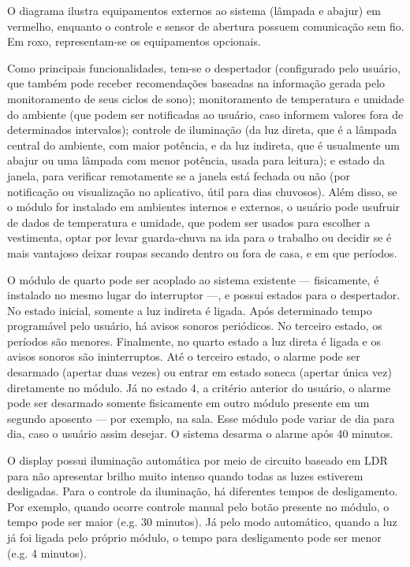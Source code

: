 O diagrama ilustra equipamentos externos ao sistema (lâmpada e abajur) em vermelho, enquanto o controle e sensor de abertura possuem comunicação sem fio. Em roxo, representam-se os equipamentos opcionais.

Como principais funcionalidades, tem-se o despertador (configurado pelo usuário, que também pode receber recomendações baseadas na informação gerada pelo monitoramento de seus ciclos de sono); monitoramento de temperatura e umidade do ambiente (que podem ser notificadas ao usuário, caso informem valores fora de determinados intervalos); controle de iluminação (da luz direta, que é a lâmpada central do ambiente, com maior potência, e da luz indireta, que é usualmente um abajur ou uma lâmpada com menor potência, usada para leitura); e estado da janela, para verificar remotamente se a janela está fechada ou não (por notificação ou visualização no aplicativo, útil para dias chuvosos). Além disso, se o módulo for instalado em ambientes internos e externos, o usuário pode usufruir de dados de temperatura e umidade, que podem ser usados para escolher a vestimenta, optar por levar guarda-chuva na ida para o trabalho ou decidir se é mais vantajoso deixar roupas secando dentro ou fora de casa, e em que períodos.

O módulo de quarto pode ser acoplado ao sistema existente --- fisicamente, é instalado no mesmo lugar do interruptor ---, e possui estados para o despertador. No estado inicial, somente a luz indireta é ligada. Após determinado tempo programável pelo usuário, há avisos sonoros periódicos. No terceiro estado, os períodos são menores. Finalmente, no quarto estado a luz direta é ligada e os avisos sonoros são ininterruptos. Até o terceiro estado, o alarme pode ser desarmado (apertar duas vezes) ou entrar em estado soneca (apertar única vez) diretamente no módulo. Já no estado 4, a critério anterior do usuário, o alarme pode ser desarmado somente fisicamente em outro módulo presente em um segundo aposento --- por exemplo, na sala. Esse módulo pode variar de dia para dia, caso o usuário assim desejar. O sistema desarma o alarme após 40 minutos.

O display possui iluminação automática por meio de circuito baseado em LDR para não apresentar brilho muito intenso quando todas as luzes estiverem desligadas. Para o controle da iluminação, há diferentes tempos de desligamento. Por exemplo, quando ocorre controle manual pelo botão presente no módulo, o tempo pode ser maior (e.g. 30 minutos). Já pelo modo automático, quando a luz já foi ligada pelo próprio módulo, o tempo para desligamento pode ser menor (e.g. 4 minutos).

